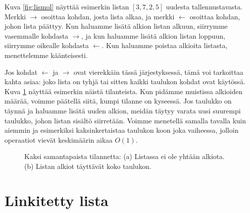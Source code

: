 Kuva \ref{fig:lismol} näyttää esimerkin listan $[3,7,2,5]$
uudesta tallennustavasta.
Merkki $\rightarrow$ osoittaa kohdan, josta lista alkaa,
ja merkki $\leftarrow$ osoittaa kohdan, johon lista päättyy.
Kun haluamme lisätä alkion listan alkuun,
siirrymme vasemmalle kohdasta $\rightarrow$,
ja kun haluamme lisätä alkion listan loppuun,
siirrymme oikealle kohdasta $\leftarrow$.
Kun haluamme poistaa alkioita listasta,
menettelemme käänteisesti.

Jos kohdat $\leftarrow$ ja $\rightarrow$ ovat vierekkäin
tässä järjestyksessä, tämä voi tarkoittaa kahta asiaa:
joko lista on tyhjä tai sitten kaikki taulukon kohdat ovat käytössä.
Kuva \ref{fig:lismol2} näyttää esimerkin näistä tilanteista.
Kun pidämme muistissa alkioiden määrää,
voimme päätellä siitä, kumpi tilanne on kyseessä.
Jos taulukko on täynnä ja haluamme lisätä uuden alkion,
meidän täytyy varata uusi suurempi taulukko, johon listan sisältö siirretään.
Voimme menetellä samalla tavalla kuin aiemmin ja
esimerkiksi kaksinkertaistaa taulukon koon joka vaiheessa,
jolloin operaatiot vievät keskimäärin aikaa $O(1)$.

\begin{figure}
\center
{}
\caption{Kaksi samantapaista tilannetta:
(a) Listassa ei ole yhtään alkiota.
(b) Listan alkiot täyttävät koko taulukon.}
\label{fig:lismol2}
\end{figure}

\section{Linkitetty lista}

